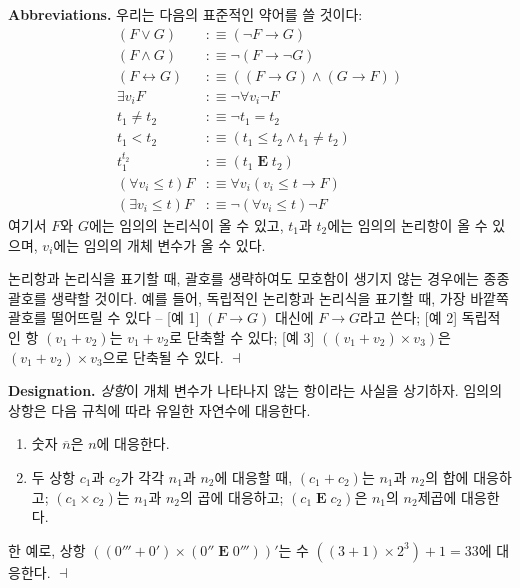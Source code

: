 \documentclass[12pt]{paper}
\newenvironment{context}[1][]
{ \noindent \textbf{{#1}.} }
{ \hfill $ \dashv $ }
\begin{document}
\begin{context}[Abbreviations]
우리는 다음의 표준적인 약어를 쓸 것이다:
\begin{align*}
\left( F \lor G \right) & : \equiv \left( \lnot F \rightarrow G \right) \\
\left( F \land G \right) & : \equiv \lnot \left( F \rightarrow \lnot G \right) \\
\left( F \leftrightarrow G \right) & : \equiv \left( \left( F \rightarrow G \right) \land \left( G \rightarrow F \right) \right) \\
\exists v_{i} F & : \equiv \lnot \forall v_{i} \lnot F \\
t_{1} \neq t_{2} & : \equiv \lnot t_{1} = t_{2} \\
t_{1} < t_{2} & : \equiv \left( t_{1} \leq t_{2} \land t_{1} \neq t_{2} \right) \\
t_{1}^{t_{2}} & : \equiv \left( t_{1} \mathop{\mathbf{E}} t_{2} \right) \\
\left( \forall v_{i} \leq t \right) F & : \equiv \forall v_{i} \left( v_{i} \leq t \rightarrow F \right) \\
\left( \exists v_{i} \leq t \right) F & : \equiv \lnot \left( \forall v_{i} \leq t \right) \lnot F
\end{align*}
여기서 $F$와 $G$에는 임의의 논리식이 올 수 있고,
$t_{1}$과 $t_{2}$에는 임의의 논리항이 올 수 있으며,
$v_{i}$에는 임의의 개체 변수가 올 수 있다.

논리항과 논리식을 표기할 때,
괄호를 생략하여도 모호함이 생기지 않는 경우에는 종종 괄호를 생략할 것이다.
예를 들어, 독립적인 논리항과 논리식을 표기할 때, 가장 바깥쪽 괄호를 떨어뜨릴 수 있다 --
[예 1] $\left( F \rightarrow G \right)$ 대신에 $F \rightarrow G$라고 쓴다;
[예 2] 독립적인 항 $\left( v_{1} + v_{2} \right)$는 $v_{1} + v_{2}$로 단축할 수 있다;
[예 3] $\left( \left( v_{1} + v_{2} \right) \times v_{3} \right)$은 $\left( v_{1} + v_{2} \right) \times v_{3}$으로 단축될 수 있다.
\end{context}

\begin{context}[Designation]
\textit{상항}이 개체 변수가 나타나지 않는 항이라는 사실을 상기하자.
임의의 상항은 다음 규칙에 따라 유일한 자연수에 대응한다.
\begin{enumerate}
\item 숫자 $\overline{n}$은 $n$에 대응한다.
\item 두 상항 $c_{1}$과 $c_{2}$가 각각 $n_{1}$과 $n_{2}$에 대응할 때,
$\left( c_{1} + c_{2} \right)$는 $n_{1}$과 $n_{2}$의 합에 대응하고;
$\left( c_{1} \times c_{2} \right)$는 $n_{1}$과 $n_{2}$의 곱에 대응하고;
$\left( c_{1} \mathop{\mathbf{E}} c_{2} \right)$은 $n_{1}$의 $n_{2}$제곱에 대응한다.
\end{enumerate}

한 예로, 상항 $\left( \left( 0''' + 0' \right) \times \left( 0'' \mathop{\mathbf{E}} 0''' \right) \right) '$는
수 $\left( \left( 3 + 1 \right) \times 2^{3} \right) + 1 = 33$에 대응한다.
\end{context}
\end{document}
